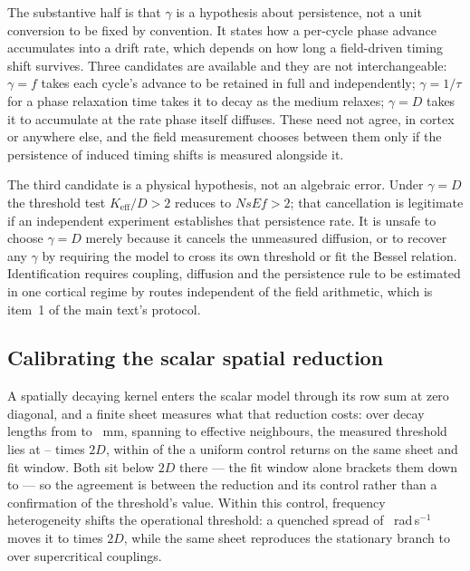 \documentclass{article}
\begin{document}
The substantive half is that $\gamma$ is a hypothesis about persistence, not a unit conversion to be fixed by convention. It states how a per-cycle phase advance accumulates into a drift rate, which depends on how long a field-driven timing shift survives. Three candidates are available and they are not interchangeable: $\gamma=f$ takes each cycle's advance to be retained in full and independently; $\gamma=1/\tau$ for a phase relaxation time takes it to decay as the medium relaxes; $\gamma=D$ takes it to accumulate at the rate phase itself diffuses. These need not agree, in cortex or anywhere else, and the field measurement chooses between them only if the persistence of induced timing shifts is measured alongside it.

The third candidate is a physical hypothesis, not an algebraic error. Under $\gamma=D$ the threshold test $K_{\mathrm{eff}}/D>2$ reduces to $NsEf>2$; that cancellation is legitimate if an independent experiment establishes that persistence rate. It is unsafe to choose $\gamma=D$ merely because it cancels the unmeasured diffusion, or to recover any $\gamma$ by requiring the model to cross its own threshold or fit the Bessel relation. Identification requires coupling, diffusion and the persistence rule to be estimated in one cortical regime by routes independent of the field arithmetic, which is item~1 of the main text's protocol.

\subsection{Calibrating the scalar spatial reduction}
\label{sec:supp-reduction}

A spatially decaying kernel enters the scalar model through its row sum at zero diagonal, and a finite sheet measures what that reduction costs: over decay lengths from \reductionDecayMin{} to \reductionDecayMax~mm, spanning \reductionNeighbourMin{} to \reductionNeighbourMax{} effective neighbours, the measured threshold lies at \reductionRatioMin--\reductionRatioMax{} times $2D$, within \reductionRuleSpread{} of the \reductionMeanFieldRatio{} a uniform control returns on the same sheet and fit window. Both sit below $2D$ there --- the fit window alone brackets them down to \reductionWindowLow{} --- so the agreement is between the reduction and its control rather than a confirmation of the threshold's value. Within this control, frequency heterogeneity shifts the operational threshold: a quenched spread of \reductionFrequencySd~rad\,s$^{-1}$ moves it to \reductionHeterogeneousRatio{} times $2D$, while the same sheet reproduces the stationary branch to \reductionBranchResidual{} over \reductionBranchPoints{} supercritical couplings.
\end{document}
